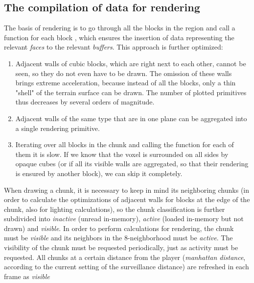 \subsection{The compilation of data for rendering} \label{buildDrawData}
The basis of rendering is to go through all the blocks in the region and call a function for each block , which ensures the insertion of data representing the relevant \textit{faces} to the relevant \textit{buffers}. This approach is further optimized:

\begin{enumerate}
	\item Adjacent walls of cubic blocks, which are right next to each other, cannot be seen, so they do not even have to be drawn. The omission of these walls brings extreme acceleration, because instead of all the blocks, only a thin "shell" of the terrain surface can be drawn. The number of plotted primitives thus decreases by several orders of magnitude.
	
	\item Adjacent walls of the same type that are in one plane can be aggregated into a single rendering primitive.
	
	\item Iterating over all blocks in the chunk and calling the function  for each of them it is slow. If we know that the voxel is surrounded on all sides by opaque cubes (or if all its visible walls are aggregated, so that their rendering is ensured by another block), we can skip it completely.
\end{enumerate}

When drawing a chunk, it is necessary to keep in mind its neighboring chunks (in order to calculate the optimizations of adjacent walls for blocks at the edge of the chunk, also for lighting calculations), so the chunk classification is further subdivided into \textit{inactive} (unread in-memory), \textit{active} (loaded in-memory but not drawn) and \textit{visible}. In order to perform calculations for rendering, the chunk must be \textit{visible} and its neighbors in the 8-neighborhood must be \textit{active}. The visibility of the chunk must be requested periodically, just as activity must be requested. All chunks at a certain distance from the player (\textit{manhattan distance}, according to the current setting of the surveillance distance) are refreshed in each frame as \textit{visible}

